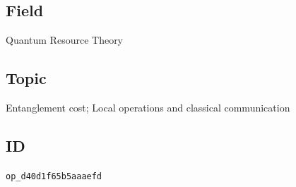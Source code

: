 \subsection*{Field}

Quantum Resource Theory

\subsection*{Topic}

Entanglement cost; Local operations and classical communication

\subsection*{ID}

\texttt{op\_d40d1f65b5aaaefd}
